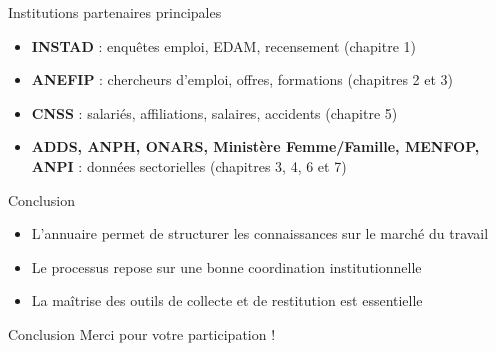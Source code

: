 \documentclass{beamer}
\begin{document}


\begin{frame}{Institutions partenaires principales}
\begin{itemize}
  \item \textbf{INSTAD} : enqu\^etes emploi, EDAM, recensement (chapitre 1)
  \item \textbf{ANEFIP} : chercheurs d’emploi, offres, formations (chapitres 2 et 3)
  \item \textbf{CNSS} : salari\'es, affiliations, salaires, accidents (chapitre 5)
  \item \textbf{ADDS, ANPH, ONARS, Minist\`ere Femme/Famille, MENFOP, ANPI} : donn\'ees sectorielles (chapitres 3, 4, 6 et 7)
\end{itemize}
\end{frame}

\begin{frame}{Conclusion}
\begin{itemize}
  \item L’annuaire permet de structurer les connaissances sur le march\'e du travail
  \item Le processus repose sur une bonne coordination institutionnelle
  \item La ma\^itrise des outils de collecte et de restitution est essentielle
\end{itemize}

\end{frame}

\begin{frame}{Conclusion}
\centering
Merci pour votre participation !
\end{frame}
\end{document}
